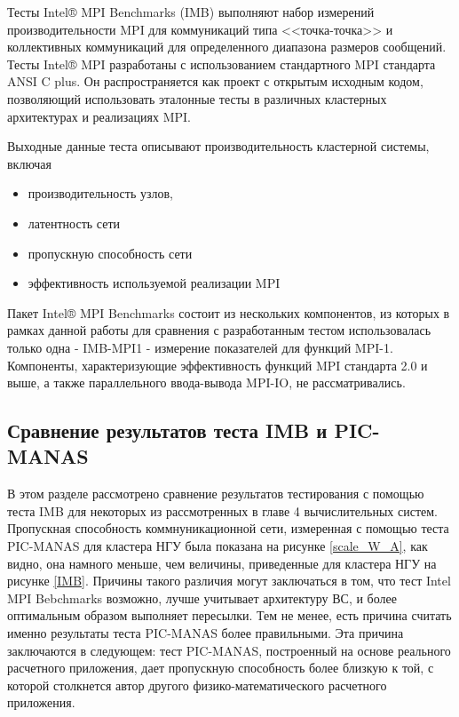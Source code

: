 Тесты Intel® MPI Benchmarks (IMB) \cite{IMB} выполняют набор измерений производительности MPI для коммуникаций типа <<точка-точка>> и коллективных коммуникаций для определенного диапазона размеров сообщений. Тесты Intel® MPI разработаны с использованием стандартного MPI стандарта ANSI C plus. Он распространяется как проект с открытым исходным кодом, позволяющий использовать эталонные тесты в различных кластерных архитектурах и реализациях MPI.

Выходные данные теста описывают производительность кластерной системы, включая 
\begin{itemize}
	\item производительность узлов, 
	\item латентность сети  
	\item пропускную способность сети
	\item эффективность используемой реализации MPI
\end{itemize}

Пакет Intel® MPI Benchmarks состоит из нескольких компонентов, из которых в рамках данной работы для сравнения с разработанным тестом использовалась только одна - IMB-MPI1 - измерение показателей для функций MPI-1. Компоненты, характеризующие эффективность функций MPI стандарта 2.0 и выше, а также параллельного ввода-вывода MPI-IO, не рассматривались.

\subsection{Сравнение результатов теста IMB и PIC-MANAS} 

В этом разделе рассмотрено сравнение результатов тестирования с помощью теста IMB для некоторых из рассмотренных в главе 4 вычислительных систем. Пропускная способность коммнуникационной сети, измеренная с помощью теста PIC-MANAS для кластера НГУ была показана на рисунке \ref{scale_W_A}, как видно, она намного меньше, чем величины, приведенные для кластера НГУ на рисунке \ref{IMB}.
Причины такого различия могут заключаться в том, что тест Intel MPI Bebchmarks  возможно, лучше учитывает архитектуру ВС, и более оптимальным образом выполняет пересылки. Тем не менее, есть причина считать именно результаты теста PIC-MANAS более правильными. Эта причина заключаются в следующем: тест PIC-MANAS, построенный на основе реального расчетного приложения, дает пропускную способность более близкую к той, с которой столкнется автор другого физико-математического расчетного приложения.  


